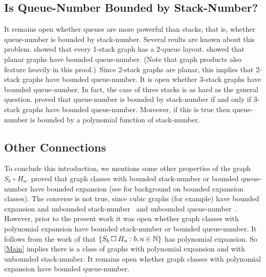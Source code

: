 \documentclass[kpfonts]{patmorin}
\newcommand{\CartProd}{\mathbin{\square}}
\begin{document}

\subsection*{Is Queue-Number Bounded by Stack-Number? }

It remains open whether queues are more powerful than stacks; that is, whether queue-number is bounded by stack-number. Several reults are known about this problem. \citet{HLR92} showed that every 1-stack graph has a 2-queue layout. \citet{DJMMUW20} showed that planar graphs have bounded queue-number. (Note that graph products also feature heavily in this proof.)\ Since 2-stack graphs are planar, this implies that 2-stack graphs have bounded queue-number. It is open whether 3-stack graphs have bounded queue-number. In fact, the case of three stacks is as hard as the general question. \citet{DujWoo05} proved that queue-number is bounded by stack-number if and only if 3-stack graphs have bounded queue-number. Moreover, if this is true then queue-number is bounded by a polynomial function of stack-number.

\subsection*{Other Connections}

To conclude this introduction, we mentions some other properties of the graph $S_b\CartProd H_n$. \citet{NOW11} proved that graph classes with bounded stack-number or bounded queue-number have bounded expansion (see \citep{Sparsity} for background on bounded expansion classes). The converse is not true, since cubic graphs (for example) have bounded expansion and unbounded stack-number~\citep{Malitz94a} and unbounded queue-number~\citep{Wood-QueueDegree}. However, prior to the present work it was open whether graph classes with polynomial expansion have bounded stack-number or bounded queue-number. It follows from the work of \citet[Theorem~19]{DHJLW20} that $\{ S_b \CartProd H_n : b,n\in\N \}$ has polynomial expansion. So \cref{Main} implies there is a class of graphs with polynomial expansion and with unbounded stack-number. It remains open whether graph classes with polynomial expansion have bounded queue-number. 
\end{document}
